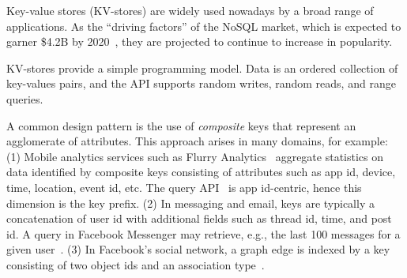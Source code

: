 Key-value stores (KV-stores) are widely used nowadays by a broad range of applications. As the 
``driving factors'' of the NoSQL market, which is expected to garner \$4.2B by 2020~\cite{alliedmarketresearch}, they are projected
to continue to increase in popularity.

KV-stores provide a simple programming model. 
Data is an ordered collection of key-values pairs, and  the API supports random writes, 
random reads, and range queries. 

A common design pattern is the use of \emph{composite} 
keys that represent an agglomerate of attributes.
This approach arises in many domains, for example: 
(1) Mobile analytics services such as Flurry Analytics~\cite{flurry} aggregate statistics 
on data identified by composite keys consisting of attributes such as app id, device, time, location, 
event id, etc. The query API~\cite{flurry-api} is app id-centric, hence this dimension is the key prefix.
(2) In messaging and email, keys are typically a concatenation of user id with additional fields 
such as thread id, time, and post id. A query in Facebook Messenger may retrieve, e.g., the last 100 messages for a 
given user~\cite{Borthakur:2011:AHG:1989323.1989438}. %
(3) In Facebook's social network, a graph edge is indexed by a key consisting of two 
object ids and an association type~\cite{Armstrong:2013:LDB:2463676.2465296}.

